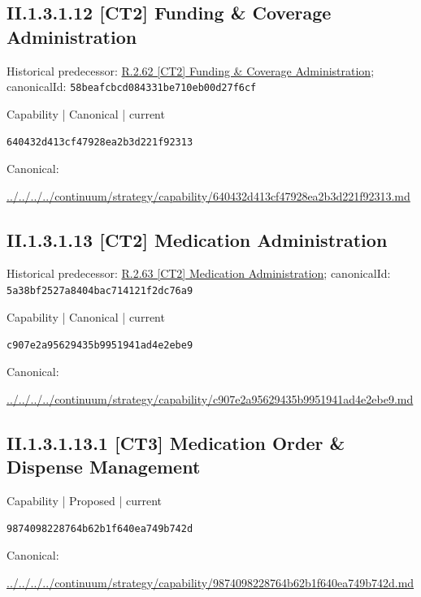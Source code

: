 \documentclass[10pt,a4paper]{article}
\begin{document}
\subsection*{II.1.3.1.12 [CT2] Funding \& Coverage Administration}
Historical predecessor: \hyperref[element-58beafcbcd084331be710eb00d27f6cf]{R.2.62 [CT2] Funding \& Coverage Administration}; canonicalId: \texttt{58beafcbcd084331be710eb00d27f6cf}\par
\label{element-640432d413cf47928ea2b3d221f92313}
{\small Capability | Canonical | current}\par
\texttt{640432d413cf47928ea2b3d221f92313}\par
Canonical: \par
{\footnotesize\url{../../../../continuum/strategy/capability/640432d413cf47928ea2b3d221f92313.md}}\par
\subsection*{II.1.3.1.13 [CT2] Medication Administration}
Historical predecessor: \hyperref[element-5a38bf2527a8404bac714121f2dc76a9]{R.2.63 [CT2] Medication Administration}; canonicalId: \texttt{5a38bf2527a8404bac714121f2dc76a9}\par
\label{element-c907e2a95629435b9951941ad4e2ebe9}
{\small Capability | Canonical | current}\par
\texttt{c907e2a95629435b9951941ad4e2ebe9}\par
Canonical: \par
{\footnotesize\url{../../../../continuum/strategy/capability/c907e2a95629435b9951941ad4e2ebe9.md}}\par
\subsection*{II.1.3.1.13.1 [CT3] Medication Order \& Dispense Management}
\label{element-9874098228764b62b1f640ea749b742d}
{\small Capability | Proposed | current}\par
\texttt{9874098228764b62b1f640ea749b742d}\par
Canonical: \par
{\footnotesize\url{../../../../continuum/strategy/capability/9874098228764b62b1f640ea749b742d.md}}\par
\end{document}
